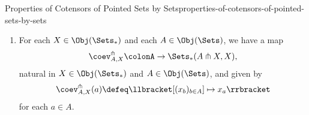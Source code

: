 \begin{proposition}{Properties of Cotensors of Pointed Sets by Sets}{properties-of-cotensors-of-pointed-sets-by-sets}
\begin{enumerate}
\[            \]%
            for each $x\in X$.%
        \item\label{properties-of-cotensors-of-pointed-sets-by-sets-the-cotensor-coevaluation-map}For each $X\in\Obj(\Sets_{*})$ and each $A\in\Obj(\Sets)$, we have a map
            \[
                \coev^{\pitchfork}_{A,X}%
                \colon%
                A%
                \to%
                \Sets_{*}(A\pitchfork X,X),%
            \]%
            natural in $X\in\Obj(\Sets_{*})$ and $A\in\Obj(\Sets)$, and given by
            \[%
                \coev^{\pitchfork}_{A,X}(a)%
                \defeq%
                \llbracket[(x_{b})_{b\in A}]\mapsto x_{a}\rrbracket%
            \]%
            for each $a\in A$.%
    \end{enumerate}
\end{proposition}

